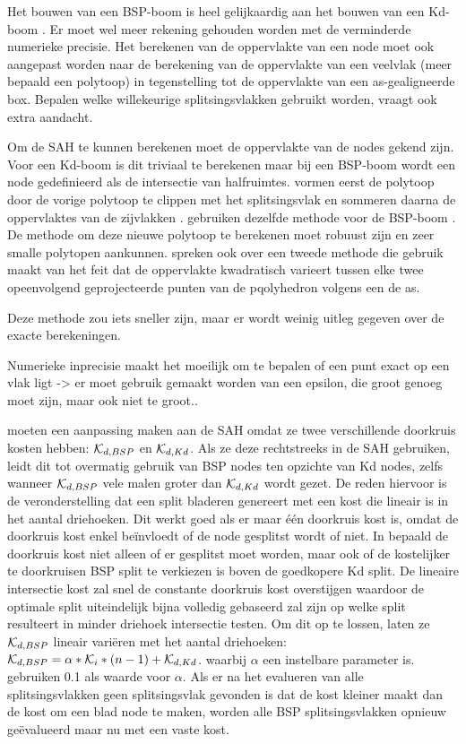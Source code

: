 Het bouwen van een BSP-boom is heel gelijkaardig aan het bouwen van een Kd-boom \cite{Ize}. 
Er moet wel meer rekening gehouden worden met de verminderde numerieke precisie. 
Het berekenen van de oppervlakte van een node moet ook aangepast worden naar de berekening van de oppervlakte van een veelvlak (meer bepaald een polytoop) in tegenstelling tot de oppervlakte van een as-gealigneerde box.
Bepalen welke willekeurige splitsingsvlakken gebruikt worden, vraagt ook extra aandacht.

Om de SAH te kunnen berekenen moet de oppervlakte van de nodes gekend zijn. 
Voor een Kd-boom is dit triviaal te berekenen maar bij een BSP-boom wordt een node gedefinieerd als de intersectie van halfruimtes.
\authorKammaje{ }vormen eerst de polytoop door de vorige polytoop te clippen met het splitsingsvlak en sommeren daarna de oppervlaktes van de zijvlakken \cite{Kammaje}.
\authorIze{ }gebruiken dezelfde methode voor de BSP-boom \cite{Ize}.
De methode om deze nieuwe polytoop te berekenen moet robuust zijn en zeer smalle polytopen aankunnen.
\authorKammaje{ }spreken ook over een tweede methode die gebruik maakt van het feit dat de oppervlakte kwadratisch varieert tussen elke twee opeenvolgend geprojecteerde punten van de pqolyhedron volgens een de as. 

Deze methode zou iets sneller zijn, maar er wordt weinig uitleg gegeven over de exacte berekeningen.

Numerieke inprecisie maakt het moeilijk om te bepalen of een punt exact op een vlak ligt -> er moet gebruik gemaakt worden van een epsilon, die groot genoeg moet zijn, maar ook niet te groot.\cite{Ize}.  

\authorIze{ }moeten een aanpassing maken aan de SAH omdat ze twee verschillende doorkruis kosten hebben: $\mathcal{K}_{d,BSP}$ en $\mathcal{K}_{d,Kd}$.
Als ze deze rechtstreeks in de SAH gebruiken, leidt dit tot overmatig gebruik van BSP nodes ten opzichte van Kd nodes, zelfs wanneer $\mathcal{K}_{d,BSP}$ vele malen groter dan $\mathcal{K}_{d,Kd}$ wordt gezet.
De reden hiervoor is de veronderstelling dat een split bladeren genereert met een kost die lineair is in het aantal driehoeken.
Dit werkt goed als er maar één doorkruis kost is, omdat de doorkruis kost enkel beïnvloedt of de node gesplitst wordt of niet.
In \cite{Ize} bepaald de doorkruis kost niet alleen of er gesplitst moet worden, maar ook of de kostelijker te doorkruisen BSP split te verkiezen is boven de goedkopere Kd split.
De lineaire intersectie kost zal snel de constante doorkruis kost overstijgen waardoor de optimale split uiteindelijk bijna volledig gebaseerd zal zijn op welke split resulteert in minder driehoek intersectie testen.
Om dit op te lossen, laten ze $\mathcal{K}_{d,BSP}$ lineair variëren met het aantal driehoeken: $\mathcal{K}_{d,BSP} = \alpha * \mathcal{K}_i * (n - 1) + \mathcal{K}_{d,Kd}$. waarbij $\alpha$ een instelbare parameter is. \authorIze{ }gebruiken 0.1 als waarde voor $\alpha$.
Als er na het evalueren van alle splitsingsvlakken geen splitsingsvlak gevonden is dat de kost kleiner maakt dan de kost om een blad node te maken, worden alle BSP splitsingsvlakken opnieuw geëvalueerd maar nu met een vaste kost.

